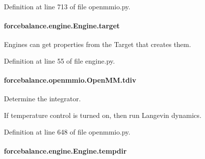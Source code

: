 Definition at line 713 of file openmmio.\-py.

\hypertarget{classforcebalance_1_1engine_1_1Engine_a1fdd29fbd127cba331326a3557558e2a}{
\paragraph[{target}]{\setlength{\rightskip}{0pt plus 5cm}forcebalance.\-engine.\-Engine.\-target\hspace{0.3cm}{\ttfamily [inherited]}}}\label{classforcebalance_1_1engine_1_1Engine_a1fdd29fbd127cba331326a3557558e2a}


Engines can get properties from the Target that creates them. 



Definition at line 55 of file engine.\-py.

\hypertarget{classforcebalance_1_1openmmio_1_1OpenMM_a743983d151ddc558ad2143304e6e4e67}{
\paragraph[{tdiv}]{\setlength{\rightskip}{0pt plus 5cm}forcebalance.\-openmmio.\-Open\-M\-M.\-tdiv}}\label{classforcebalance_1_1openmmio_1_1OpenMM_a743983d151ddc558ad2143304e6e4e67}


Determine the integrator. 

If temperature control is turned on, then run Langevin dynamics. 

Definition at line 648 of file openmmio.\-py.

\hypertarget{classforcebalance_1_1engine_1_1Engine_a7bb2deae7ee926f0df7758a92b382515}{
\paragraph[{tempdir}]{\setlength{\rightskip}{0pt plus 5cm}forcebalance.\-engine.\-Engine.\-tempdir\hspace{0.3cm}{\ttfamily [inherited]}}}\label{classforcebalance_1_1engine_1_1Engine_a7bb2deae7ee926f0df7758a92b382515}


